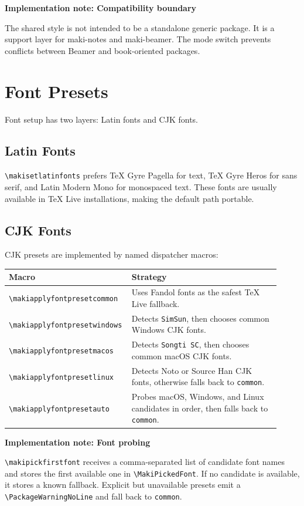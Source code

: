 \documentclass[a4paper,11pt]{ltxdoc}
\newcommand{\mcls}[1]{\textsf{#1}}
\newcommand{\mopt}[1]{\texttt{#1}}
\newcommand{\mcmd}[1]{\texttt{\textbackslash#1}}
\newenvironment{implementation}[1]
  {\par\medskip\noindent\textbf{\color{MakiBlue}Implementation note: #1}\par\smallskip}
  {\par\medskip}
\begin{document}
\begin{implementation}{Compatibility boundary}
The shared style is not intended to be a standalone generic package. It is a
support layer for \mcls{maki-notes} and \mcls{maki-beamer}. The mode switch
prevents conflicts between Beamer and book-oriented packages.
\end{implementation}

\section{Font Presets}

Font setup has two layers: Latin fonts and CJK fonts.

\subsection{Latin Fonts}

\mcmd{makisetlatinfonts} prefers TeX Gyre Pagella for text, TeX Gyre Heros for
sans serif, and Latin Modern Mono for monospaced text. These fonts are usually
available in TeX Live installations, making the default path portable.

\subsection{CJK Fonts}

CJK presets are implemented by named dispatcher macros:

\begin{longtable}{@{}p{0.38\linewidth}p{0.54\linewidth}@{}}
\toprule
Macro & Strategy \\
\midrule
\mcmd{makiapplyfontpresetcommon} & Uses Fandol fonts as the safest TeX Live fallback.\\
\mcmd{makiapplyfontpresetwindows} & Detects \mopt{SimSun}, then chooses common Windows CJK fonts.\\
\mcmd{makiapplyfontpresetmacos} & Detects \mopt{Songti SC}, then chooses common macOS CJK fonts.\\
\mcmd{makiapplyfontpresetlinux} & Detects Noto or Source Han CJK fonts, otherwise falls back to \mopt{common}.\\
\mcmd{makiapplyfontpresetauto} & Probes macOS, Windows, and Linux candidates in order, then falls back to \mopt{common}.\\
\bottomrule
\end{longtable}

\begin{implementation}{Font probing}
\mcmd{makipickfirstfont} receives a comma-separated list of candidate font names
and stores the first available one in \mcmd{MakiPickedFont}. If no candidate is
available, it stores a known fallback. Explicit but unavailable presets emit a
\mcmd{PackageWarningNoLine} and fall back to \mopt{common}.
\end{implementation}
\end{document}
